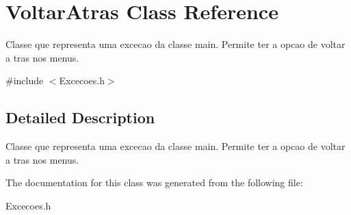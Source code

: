 \hypertarget{class_voltar_atras}{}\section{Voltar\+Atras Class Reference}
\label{class_voltar_atras}


Classe que representa uma excecao da classe main. Permite ter a opcao de voltar a tras nos menus.  




{\ttfamily \#include $<$Excecoes.\+h$>$}



\subsection{Detailed Description}
Classe que representa uma excecao da classe main. Permite ter a opcao de voltar a tras nos menus. 

The documentation for this class was generated from the following file\+:\begin{DoxyCompactItemize}
\item 
Excecoes.\+h\end{DoxyCompactItemize}
